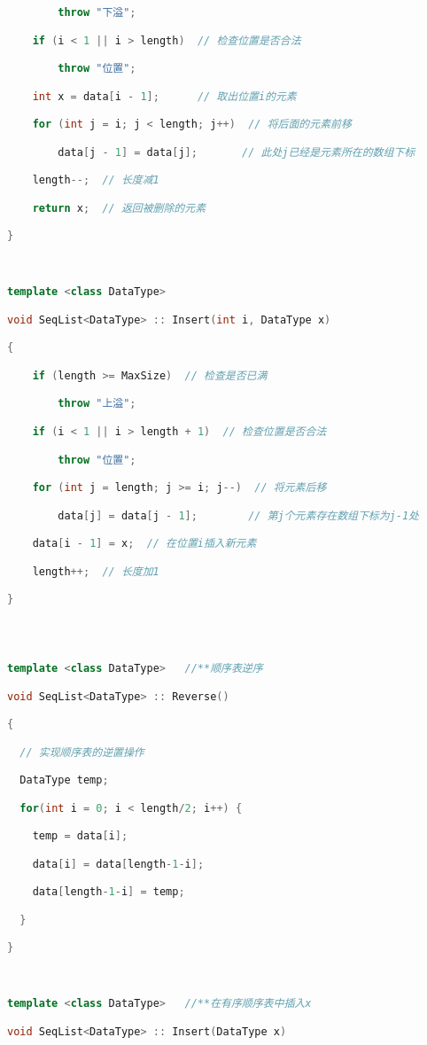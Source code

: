 \begin{lstlisting}[language=C++]
        throw "下溢";

    if (i < 1 || i > length)  // 检查位置是否合法

        throw "位置";

    int x = data[i - 1];      // 取出位置i的元素

    for (int j = i; j < length; j++)  // 将后面的元素前移

        data[j - 1] = data[j];       // 此处j已经是元素所在的数组下标

    length--;  // 长度减1

    return x;  // 返回被删除的元素

}

  

template <class DataType>  

void SeqList<DataType> :: Insert(int i, DataType x)

{

    if (length >= MaxSize)  // 检查是否已满

        throw "上溢";

    if (i < 1 || i > length + 1)  // 检查位置是否合法

        throw "位置";

    for (int j = length; j >= i; j--)  // 将元素后移

        data[j] = data[j - 1];        // 第j个元素存在数组下标为j-1处

    data[i - 1] = x;  // 在位置i插入新元素

    length++;  // 长度加1

}

  
  

template <class DataType>   //**顺序表逆序  

void SeqList<DataType> :: Reverse()

{  

  // 实现顺序表的逆置操作

  DataType temp;

  for(int i = 0; i < length/2; i++) {

    temp = data[i];

    data[i] = data[length-1-i];

    data[length-1-i] = temp;

  }

}

  

template <class DataType>   //**在有序顺序表中插入x  

void SeqList<DataType> :: Insert(DataType x)


\end{lstlisting}
